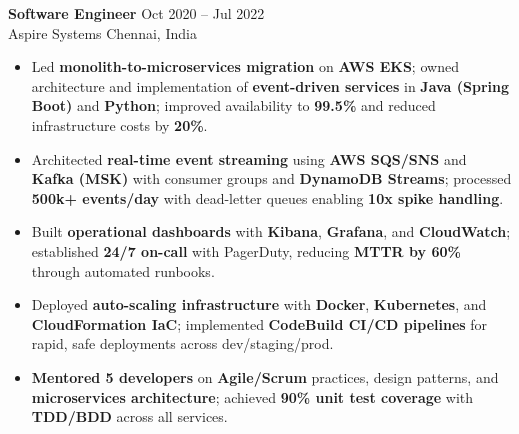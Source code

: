 \documentclass[letterpaper,10pt]{article}
\newcommand{\resumeItem}[1]{\item\small #1}
\newcommand{\resumeSubheading}[4]{
  \vspace{6pt}
  \noindent
  \textbf{#1} \hfill {\footnotesize #2} \\
  [-1pt]
  \noindent
  \small #3 \hfill {\small #4}
  \vspace{3pt}
}
\newcommand{\resumeItemsStart}{\vspace{-2pt}\begin{itemize}}
\newcommand{\resumeItemsEnd}{\end{itemize}\vspace{6pt}}
\begin{document}
\resumeSubheading
{Software Engineer}{Oct 2020 -- Jul 2022}
{Aspire Systems}{Chennai, India}
\resumeItemsStart
\resumeItem{Led \textbf{monolith-to-microservices migration} on \textbf{AWS EKS}; owned architecture and implementation of \textbf{event-driven services} in \textbf{Java (Spring Boot)} and \textbf{Python}; improved availability to \textbf{99.5\%} and reduced infrastructure costs by \textbf{20\%}.}
\resumeItem{Architected \textbf{real-time event streaming} using \textbf{AWS SQS/SNS} and \textbf{Kafka (MSK)} with consumer groups and \textbf{DynamoDB Streams}; processed \textbf{500k+ events/day} with dead-letter queues enabling \textbf{10x spike handling}.}
\resumeItem{Built \textbf{operational dashboards} with \textbf{Kibana}, \textbf{Grafana}, and \textbf{CloudWatch}; established \textbf{24/7 on-call} with PagerDuty, reducing \textbf{MTTR by 60\%} through automated runbooks.}
\resumeItem{Deployed \textbf{auto-scaling infrastructure} with \textbf{Docker}, \textbf{Kubernetes}, and \textbf{CloudFormation IaC}; implemented \textbf{CodeBuild CI/CD pipelines} for rapid, safe deployments across dev/staging/prod.}
\resumeItem{\textbf{Mentored 5 developers} on \textbf{Agile/Scrum} practices, design patterns, and \textbf{microservices architecture}; achieved \textbf{90\% unit test coverage} with \textbf{TDD/BDD} across all services.}
\resumeItemsEnd
\vspace{-6pt}

\end{document}
